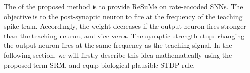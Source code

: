 The \DIFdelbegin {}\DIFdelend \DIFaddbegin {}\DIFaddend of the proposed method is to provide \DIFdelbegin {}\DIFdelend \DIFaddbegin {}\DIFaddend ReSuMe on rate-encoded SNNs.
The objective is to \DIFdelbegin {}\DIFdelend \DIFaddbegin {}\DIFaddend the post-synaptic neuron to fire at the frequency of the teaching spike train. 
Accordingly, the weight decreases if the output neuron fires stronger than the teaching neuron, and vice versa.
The synaptic strength stops changing \DIFdelbegin {}\DIFdelend \DIFaddbegin {}\DIFaddend the output neuron fires at the same frequency as the teaching signal.
In the following section, we will firstly describe this idea mathematically using the proposed term SRM, and equip \DIFdelbegin {}\DIFdelend \DIFaddbegin {}\DIFaddend biological-plausible STDP rule.


